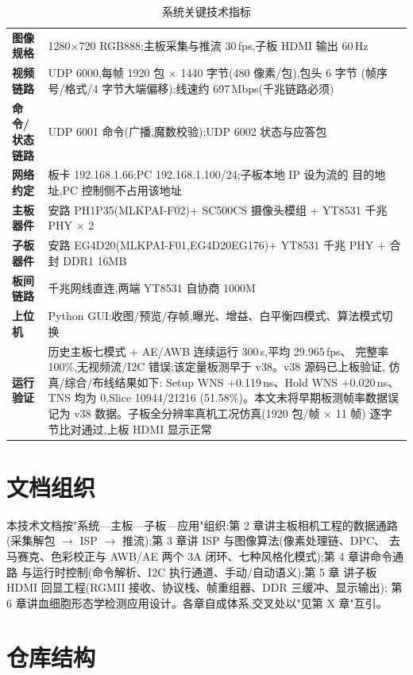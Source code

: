 \begin{table}[H]\centering\small
\caption{系统关键技术指标}
\begin{tabular}{>{\bfseries}l p{11.2cm}}
\toprule
图像规格 & 1280$\times$720 RGB888;主板采集与推流 30\,fps,子板 HDMI 输出 60\,Hz \\
视频链路 & UDP 6000,每帧 1920 包 $\times$ 1440 字节(480 像素/包),包头 6 字节
(帧序号/格式/4 字节大端偏移);线速约 697\,Mbps(千兆链路必须) \\
命令/状态链路 & UDP 6001 命令(广播,魔数校验);UDP 6002 状态与应答包 \\
网络约定 & 板卡 192.168.1.66;PC 192.168.1.100/24;子板本地 IP 设为流的
目的地址,PC 控制侧不占用该地址 \\
主板器件 & 安路 PH1P35(MLKPAI-F02)+ SC500CS 摄像头模组 + YT8531 千兆 PHY
$\times$ 2 \\
子板器件 & 安路 EG4D20(MLKPAI-F01,EG4D20EG176)+ YT8531 千兆 PHY + 合封
DDR1 16MB \\
板间链路 & 千兆网线直连,两端 YT8531 自协商 1000M \\
上位机 & Python GUI:收图/预览/存帧,曝光、增益、白平衡四模式、算法模式切换 \\
运行验证 & 历史主板七模式 + AE/AWB 连续运行 300\,s,平均 29.965\,fps、
完整率 100\%,无视频流/I2C 错误;该定量板测早于 v38。v38 源码已上板验证,
仿真/综合/布线结果如下:
Setup WNS +0.119\,ns、Hold WNS +0.020\,ns、TNS 均为 0,Slice 10944/21216
(51.58\%)。本文未将早期板测帧率数据误记为 v38 数据。子板全分辨率真机工况仿真(1920 包/帧 $\times$ 11 帧)
逐字节比对通过,上板 HDMI 显示正常 \\
\bottomrule
\end{tabular}
\end{table}

\section{文档组织}

本技术文档按"系统—主板—子板—应用"组织:第 2 章讲主板相机工程的数据通路
(采集解包 $\to$ ISP $\to$ 推流);第 3 章讲 ISP 与图像算法(像素处理链、DPC、
去马赛克、色彩校正与 AWB/AE 两个 3A 闭环、七种风格化模式);第 4 章讲命令通路
与运行时控制(命令解析、I2C 执行通道、手动/自动语义);第 5 章
讲子板 HDMI 回显工程(RGMII 接收、协议栈、帧重组器、DDR 三缓冲、显示输出);
第 6 章讲血细胞形态学检测应用设计。各章自成体系,交叉处以"见第 X 章"互引。

\section{仓库结构}

